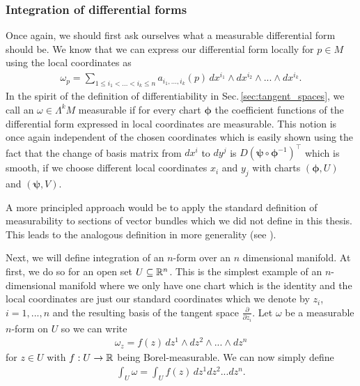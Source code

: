 \documentclass[../master_thesis.tex]{subfiles}
\begin{document}
\subsubsection{Integration of differential forms}\label{sec:integration_differential_forms_subsection}

Once again, we should first ask ourselves what a measurable differential form 
should be. We know that we can express our differential form locally 
for $p \in M$ using the local coordinates as 
\begin{align*}
    \omega_p = \sum\limits_{1\leq i_1 < ... < i_k \leq n} 
        a_{i_1,...,i_k}(p) \,dx^{i_1} \wedge dx^{i_2} \wedge ... \wedge dx^{i_k}.
\end{align*}
In the spirit of the definition of differentiability 
in Sec.\,\ref{sec:tangent_spaces}, we call an $\omega \in \Lambda^k M$
measurable if for every chart $\boldsymbol{\phi}$ the coefficient functions of the 
differential form expressed in local coordinates 
are measurable. This notion is once again independent of the chosen 
coordinates which is easily shown using the fact that the change of basis 
matrix from $dx^i$ to $dy^j$ is 
$D(\bm{\psi} \circ \bm{\phi}^{-1})^\top$ which is smooth, if we choose different local coordinates 
$x_i$ and $y_j$ with charts $(\bm{\phi}, U)$ and $(\bm{\psi}, V)$.

\begin{remark}
    A more principled approach would be to apply the standard definition of measurability 
    to sections of vector bundles which we did not define in this thesis. 
    This leads to the analogous definition in 
    more generality (see \cite[Def.\,10.2.30]{nicolaescu}).
\end{remark}

Next, we will define integration of an $n$-form over an $n$ dimensional 
manifold. At first, we do so for an open set $U \subseteq \mathbb{R}^n$.
This is the simplest example of an $n$-dimensional manifold where 
we only have one chart which is the identity and the local coordinates are 
just our standard coordinates which we denote by $z_i$, $i=1,...,n$ and the 
resulting basis of the tangent space $\frac{\partial}{\partial z_i}$. 
Let $\omega$ be a measurable 
$n$-form on $U$ so we can 
write 
\begin{align*}
    \omega_z = f(z)\, dz^1 \wedge dz^2 \wedge ... \wedge dz^n
\end{align*}
for $z \in U$ with $f:U \rightarrow \mathbb{R}$ being Borel-measurable. 
We can now simply define 
\begin{align*}
    \int_U \omega = \int_U f(z) \, dz^1 dz^2 ... dz^n.
\end{align*}
\end{document}
